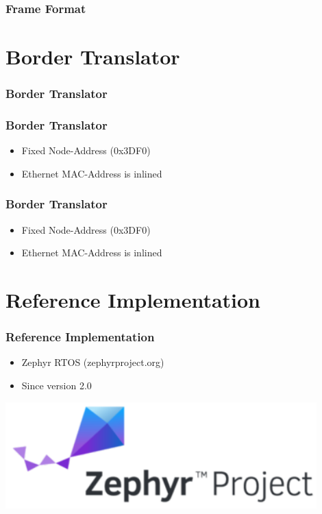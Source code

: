 \documentclass[aspectratio=169]{beamer}
\begin{document}
\begin{frame}
	\frametitle{Frame Format}
	
\end{frame}

\section{Border Translator}
\begin{frame}
	\frametitle{Border Translator}
	
\end{frame}

\begin{frame}
	\frametitle{Border Translator}
	\begin{itemize}
		\item Fixed Node-Address (0x3DF0)
		\item Ethernet MAC-Address is inlined
	\end{itemize}
	
\end{frame}

\begin{frame}
	\frametitle{Border Translator}
	\begin{itemize}
		\item Fixed Node-Address (0x3DF0)
		\item Ethernet MAC-Address is inlined
	\end{itemize}
	
\end{frame}

\section{Reference Implementation}
\begin{frame}
	\frametitle{Reference Implementation}
	\begin{minipage}[t]{0.6\textwidth}
		\begin{itemize}
			\item Zephyr RTOS (zephyrproject.org)
			\item Since version 2.0
		\end{itemize}
	\end{minipage}
	\begin{minipage}[t]{0.39\textwidth}
		\includegraphics[width=0.9\textwidth]{figures/Zephyr-Project.png}
	\end{minipage}
\end{frame}
\end{document}
